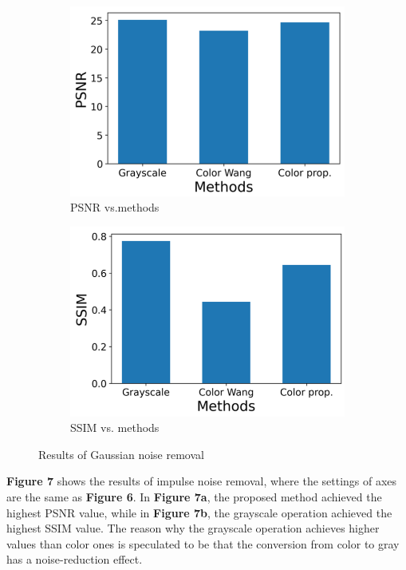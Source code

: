 \begin{figure}[H]
    \centering
    \begin{subfigure}[t]{.4\textwidth}
    \includegraphics[width=0.9\linewidth]{images/result/PSNR_gaussian.png}
    \centering
    \caption{PSNR vs.methods}
    \end{subfigure}
    \begin{subfigure}[t]{.4\textwidth}
    \includegraphics[width=0.9\linewidth]{images/result/SSIM_gaussian.png}
    \centering
    \caption{SSIM vs. methods}
    \end{subfigure}
    \caption{Results of Gaussian noise removal}
\end{figure}

\textbf{Figure 7} shows the results of impulse noise removal, where the settings of axes are the same as \textbf{Figure 6}. In \textbf{Figure 7a}, the proposed method achieved the highest PSNR value, while in \textbf{Figure 7b}, the grayscale operation achieved the highest SSIM value. The reason why the grayscale operation achieves higher values than color ones is speculated to be that the conversion from color to gray has a noise-reduction effect.

